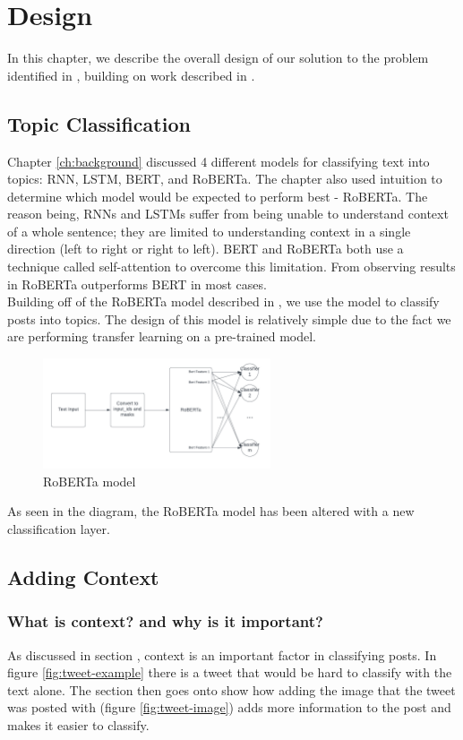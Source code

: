 \chapter{Design}
\label{ch:design}

In this chapter, we describe the overall design of our solution to the problem identified in , building on work described in .

\section{Topic Classification}
\label{sec:topic-classification}
Chapter \ref{ch:background} discussed 4 different models for classifying text into topics: RNN, LSTM, BERT, and RoBERTa.
The chapter also used intuition to determine which model would be expected to perform best - RoBERTa. The reason being,
RNNs and LSTMs suffer from being unable to understand context of a whole sentence; they are limited to understanding context
in a single direction (left to right or right to left). BERT and RoBERTa both use a technique called self-attention to overcome
this limitation. From observing results in \cite{DBLP:journals/corr/abs-1907-11692} RoBERTa outperforms BERT in most cases.\\
Building off of the RoBERTa model described in , we use the model to classify posts into topics.
The design of this model is relatively simple due to the fact we are performing transfer learning on a pre-trained model.
\begin{figure}[hbtp]
    \centering
    \includegraphics[width=0.6\textwidth]{../images/classification-model.png}
    \caption{RoBERTa model}
    \label{fig:roberta}
\end{figure}

As seen in the diagram, the RoBERTa model has been altered with a new classification layer.

\section{Adding Context}
\subsection{What is context? and why is it important?}
As discussed in section , context is an important factor in classifying posts. In figure \ref{fig:tweet-example} there
is a tweet that would be hard to classify with the text alone. The section then goes onto show how adding the image that the tweet
was posted with (figure \ref{fig:tweet-image}) adds more information to the post and makes it easier to classify.
